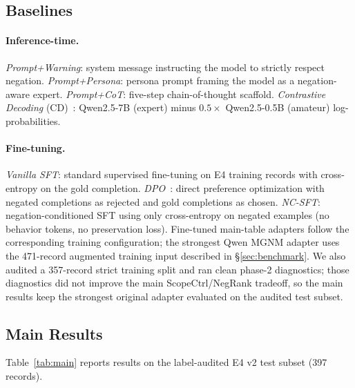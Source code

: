 \documentclass[letterpaper]{article}
\begin{document}
\subsection{Baselines}

\paragraph{Inference-time.}
\emph{Prompt+Warning}: system message instructing the model to strictly respect negation.
\emph{Prompt+Persona}: persona prompt framing the model as a negation-aware expert.
\emph{Prompt+CoT}: five-step chain-of-thought scaffold.
\emph{Contrastive Decoding} (CD)~\cite{li2023contrastive}: Qwen2.5-7B (expert)
minus $0.5\times$ Qwen2.5-0.5B (amateur) log-probabilities.

\paragraph{Fine-tuning.}
\emph{Vanilla SFT}: standard supervised fine-tuning on E4 training records
with cross-entropy on the gold completion.
\emph{DPO}~\cite{rafailov2023direct}: direct preference optimization with
negated completions as rejected and gold completions as chosen.
\emph{NC-SFT}: negation-conditioned SFT using only cross-entropy on negated
examples (no behavior tokens, no preservation loss).
Fine-tuned main-table adapters follow the corresponding training configuration;
the strongest Qwen MGNM adapter uses the 471-record augmented training input
described in \S\ref{sec:benchmark}.
We also audited a 357-record strict training split and ran clean phase-2
diagnostics; those diagnostics did not improve the main ScopeCtrl/NegRank
tradeoff, so the main results keep the strongest original adapter evaluated on
the audited test subset.

\subsection{Main Results}

Table~\ref{tab:main} reports results on the label-audited E4 v2 test subset
(397 records).
\end{document}
